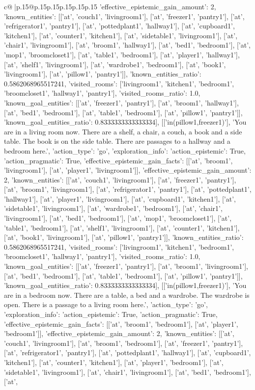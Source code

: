 \documentclass{article}
\begin{document}
{\begin{supertabular}{c@{$\;$}|p{.15\linewidth}@{}p{.15\linewidth}p{.15\linewidth}p{.15\linewidth}p{.15\linewidth}p{.15\linewidth}}
{{{'effective_epistemic_gain_amount': 2, 'known_entities': [['at', 'couch1', 'livingroom1'], ['at', 'freezer1', 'pantry1'], ['at', 'refrigerator1', 'pantry1'], ['at', 'pottedplant1', 'hallway1'], ['at', 'cupboard1', 'kitchen1'], ['at', 'counter1', 'kitchen1'], ['at', 'sidetable1', 'livingroom1'], ['at', 'chair1', 'livingroom1'], ['at', 'broom1', 'hallway1'], ['at', 'bed1', 'bedroom1'], ['at', 'mop1', 'broomcloset1'], ['at', 'table1', 'bedroom1'], ['at', 'player1', 'hallway1'], ['at', 'shelf1', 'livingroom1'], ['at', 'wardrobe1', 'bedroom1'], ['at', 'book1', 'livingroom1'], ['at', 'pillow1', 'pantry1']], 'known_entities_ratio': 0.5862068965517241, 'visited_rooms': ['livingroom1', 'kitchen1', 'bedroom1', 'broomcloset1', 'hallway1', 'pantry1'], 'visited_rooms_ratio': 1.0, 'known_goal_entities': [['at', 'freezer1', 'pantry1'], ['at', 'broom1', 'hallway1'], ['at', 'bed1', 'bedroom1'], ['at', 'table1', 'bedroom1'], ['at', 'pillow1', 'pantry1']], 'known_goal_entities_ratio': 0.8333333333333334}}], [['in(pillow1,freezer1)'], 'You are in a living room now. There are a shelf, a chair, a couch, a book and a side table. The book is on the side table. There are passages to a hallway and a bedroom here.', {'action_type': 'go', 'exploration_info': {'action_epistemic': True, 'action_pragmatic': True, 'effective_epistemic_gain_facts': [['at', 'broom1', 'livingroom1'], ['at', 'player1', 'livingroom1']], 'effective_epistemic_gain_amount': 2, 'known_entities': [['at', 'couch1', 'livingroom1'], ['at', 'freezer1', 'pantry1'], ['at', 'broom1', 'livingroom1'], ['at', 'refrigerator1', 'pantry1'], ['at', 'pottedplant1', 'hallway1'], ['at', 'player1', 'livingroom1'], ['at', 'cupboard1', 'kitchen1'], ['at', 'sidetable1', 'livingroom1'], ['at', 'wardrobe1', 'bedroom1'], ['at', 'chair1', 'livingroom1'], ['at', 'bed1', 'bedroom1'], ['at', 'mop1', 'broomcloset1'], ['at', 'table1', 'bedroom1'], ['at', 'shelf1', 'livingroom1'], ['at', 'counter1', 'kitchen1'], ['at', 'book1', 'livingroom1'], ['at', 'pillow1', 'pantry1']], 'known_entities_ratio': 0.5862068965517241, 'visited_rooms': ['livingroom1', 'kitchen1', 'bedroom1', 'broomcloset1', 'hallway1', 'pantry1'], 'visited_rooms_ratio': 1.0, 'known_goal_entities': [['at', 'freezer1', 'pantry1'], ['at', 'broom1', 'livingroom1'], ['at', 'bed1', 'bedroom1'], ['at', 'table1', 'bedroom1'], ['at', 'pillow1', 'pantry1']], 'known_goal_entities_ratio': 0.8333333333333334}}], [['in(pillow1,freezer1)'], 'You are in a bedroom now. There are a table, a bed and a wardrobe. The wardrobe is open. There is a passage to a living room here.', {'action_type': 'go', 'exploration_info': {'action_epistemic': True, 'action_pragmatic': True, 'effective_epistemic_gain_facts': [['at', 'broom1', 'bedroom1'], ['at', 'player1', 'bedroom1']], 'effective_epistemic_gain_amount': 2, 'known_entities': [['at', 'couch1', 'livingroom1'], ['at', 'broom1', 'bedroom1'], ['at', 'freezer1', 'pantry1'], ['at', 'refrigerator1', 'pantry1'], ['at', 'pottedplant1', 'hallway1'], ['at', 'cupboard1', 'kitchen1'], ['at', 'counter1', 'kitchen1'], ['at', 'player1', 'bedroom1'], ['at', 'sidetable1', 'livingroom1'], ['at', 'chair1', 'livingroom1'], ['at', 'bed1', 'bedroom1'], ['at', }}}
\end{supertabular}}
\end{document}
